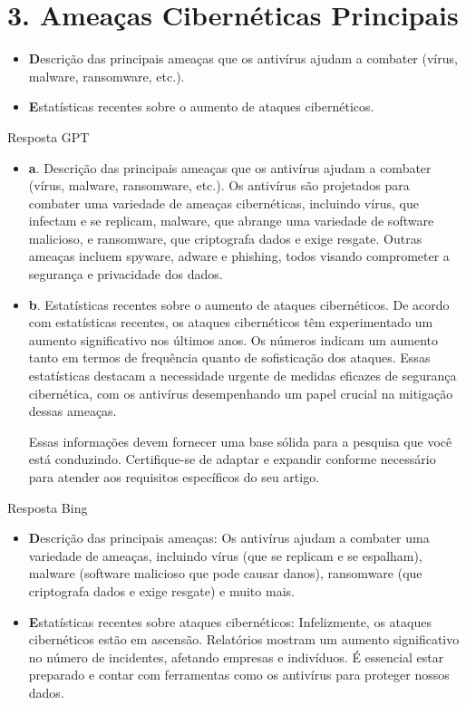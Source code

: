 \documentclass[10pt,conference,twocolumn]{article}
\begin{document}
\section* {3. Ameaças Cibernéticas Principais}
\begin{itemize}
\item \textbf Descrição das principais ameaças que os antivírus ajudam a combater (vírus, malware, ransomware, etc.).
\item \textbf Estatísticas recentes sobre o aumento de ataques cibernéticos.
\end{itemize}

Resposta GPT

\begin{itemize}
\item \textbf a. Descrição das principais ameaças que os antivírus ajudam a combater (vírus, malware, ransomware, etc.).
Os antivírus são projetados para combater uma variedade de ameaças cibernéticas, incluindo vírus, que infectam e se replicam, malware, que abrange uma variedade de software malicioso, e ransomware, que criptografa dados e exige resgate. Outras ameaças incluem spyware, adware e phishing, todos visando comprometer a segurança e privacidade dos dados.

\item \textbf b. Estatísticas recentes sobre o aumento de ataques cibernéticos.
De acordo com estatísticas recentes, os ataques cibernéticos têm experimentado um aumento significativo nos últimos anos. Os números indicam um aumento tanto em termos de frequência quanto de sofisticação dos ataques. Essas estatísticas destacam a necessidade urgente de medidas eficazes de segurança cibernética, com os antivírus desempenhando um papel crucial na mitigação dessas ameaças.

Essas informações devem fornecer uma base sólida para a pesquisa que você está conduzindo. Certifique-se de adaptar e expandir conforme necessário para atender aos requisitos específicos do seu artigo.
\end{itemize}

Resposta Bing

\begin{itemize}

\item \textbf Descrição das principais ameaças: Os antivírus ajudam a combater uma variedade de ameaças, incluindo vírus (que se replicam e se espalham), malware (software malicioso que pode causar danos), ransomware (que criptografa dados e exige resgate) e muito mais.
\item \textbf Estatísticas recentes sobre ataques cibernéticos: Infelizmente, os ataques cibernéticos estão em ascensão. Relatórios mostram um aumento significativo no número de incidentes, afetando empresas e indivíduos. É essencial estar preparado e contar com ferramentas como os antivírus para proteger nossos dados.
\end{itemize}
\end{document}
